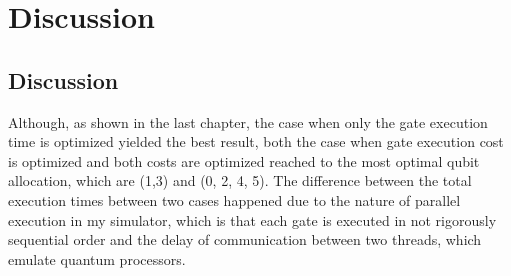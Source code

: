\chapter{Discussion}
\label{discussion}

\section{Discussion}
Although, as shown in the last chapter, the case when only the gate execution time is optimized yielded the best result, both the case when gate execution cost is optimized and both costs are optimized reached to the most optimal qubit allocation, which are (1,3) and (0, 2, 4, 5).  The difference between the total execution times between two cases happened due to the nature of parallel execution in my simulator, which is that each gate is executed in not rigorously sequential order and  the delay of communication  between two threads, which emulate quantum processors.




